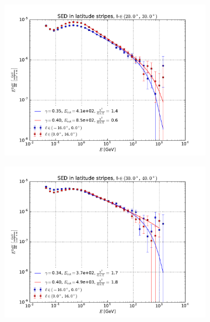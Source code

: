 \documentclass[a4paper]{article}
\begin{document}
\begin{figure}
\begin{subfigure}{0.5\textwidth}
        \includegraphics[width=\textwidth]{spectrum_of_top_bubble_in_lat_stripes_20-30.pdf}
    \end{subfigure} 
    \begin{subfigure}{0.5\textwidth}
        \includegraphics[width=\textwidth]{spectrum_of_top_bubble_in_lat_stripes_30-40.pdf}
    \end{subfigure}
    \begin{subfigure}{0.5\textwidth}

\end{subfigure}
\end{figure}
\end{document}
